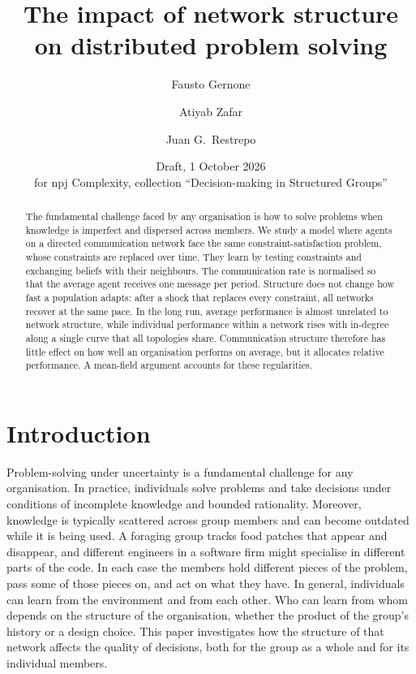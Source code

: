 \documentclass[11pt]{article}
\title{The impact of network structure on distributed problem solving}
\author{Fausto Gernone \and Atiyab Zafar \and Juan G.\ Restrepo}
\date{Draft, 1 October 2026\\ \small for npj Complexity, collection ``Decision-making in Structured Groups''}
\begin{document}
\maketitle


\begin{abstract}
The fundamental challenge faced by any organisation is how to solve problems when knowledge is imperfect and dispersed across members. We study a model where agents on a directed communication network face the same constraint-satisfaction problem, whose constraints are replaced over time. They learn by testing constraints and exchanging beliefs with their neighbours. The communication rate is normalised so that the average agent receives one message per period. Structure does not change how fast a population adapts: after a shock that replaces every constraint, all networks recover at the same pace. In the long run, average performance is almost unrelated to network structure, while individual performance within a network rises with in-degree along a single curve that all topologies share. Communication structure therefore has little effect on how well an organisation performs on average, but it allocates relative performance. A mean-field argument accounts for these regularities.
\end{abstract}


\section{Introduction}\label{sec:intro}

Problem-solving under uncertainty is a fundamental challenge for any organisation. In practice, individuals solve problems and take decisions under conditions of incomplete knowledge and bounded rationality. Moreover, knowledge is typically scattered across group members and can become outdated while it is being used. A foraging group tracks food patches that appear and disappear, and different engineers in a software firm might specialise in different parts of the code. In each case the members hold different pieces of the problem, pass some of those pieces on, and act on what they have. In general, individuals can learn from the environment and from each other. Who can learn from whom depends on the structure of the organisation, whether the product of the group's history or a design choice. This paper investigates how the structure of that network affects the quality of decisions, both for the group as a whole and for its individual members.
\end{document}
